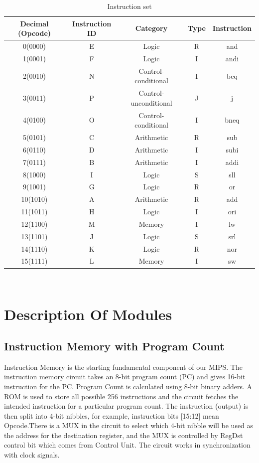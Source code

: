 \documentclass{article}
\begin{document}
\begin{table}[!h]
    \centering
\begin{tabular}{|c|c|c|c|c|}
\hline
Decimal (Opcode) & Instruction ID  & Category  & Type & Instruction \\
\hline
0(0000) & E & Logic & R & and \\
\hline
1(0001) & F & Logic & I & andi \\
\hline
2(0010)& N & Control-conditional & I & beq\\
\hline
3(0011) & P & Control-unconditional & J &  j \\
\hline
4(0100) & O & Control-conditional & I & bneq\\
\hline
5(0101) & C & Arithmetic & R & sub \\
\hline
6(0110) & D & Arithmetic & I & subi\\
\hline
7(0111) & B & Arithmetic & I & addi\\
\hline
8(1000) & I &  Logic & S & sll\\
\hline
9(1001) & G &  Logic & R & or\\
\hline
10(1010) & A & Arithmetic & R & add\\
\hline
11(1011) & H & Logic & I & ori \\
\hline
12(1100) & M & Memory & I & lw\\
\hline
13(1101) & J & Logic & S & srl \\
\hline
14(1110) & K & Logic & R & nor \\
\hline
15(1111) & L & Memory & I & sw \\
\hline

\end{tabular}
    \caption{Instruction set}
    \label{tab:ins_set}
\end{table}

\\



\section{Description Of Modules}
\subsection{Instruction Memory with Program Count}
Instruction Memory is the starting fundamental component of our MIPS. The instruction memory circuit takes an 8-bit program count (PC) and gives 16-bit instruction for the PC. Program Count is calculated using 8-bit binary adders. A ROM is used to store all possible 256 instructions and the circuit fetches the intended instruction for a particular program count. The instruction (output) is then split into 4-bit nibbles, for example, instruction bits [15:12] mean Opcode.There is a MUX in the circuit to select which 4-bit nibble will be used as the address for the destination register, and the MUX is controlled by RegDst control bit which comes from Control Unit. The circuit works in synchronization with clock signals.
\end{document}
